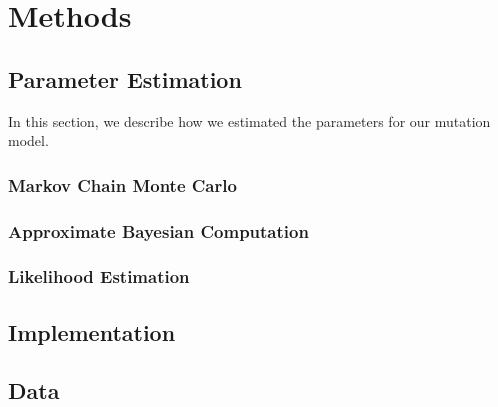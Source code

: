 \section{Methods}\label{sec:m}
\subsection{Parameter Estimation}\label{subsec:pe}
In this section, we describe how we estimated the parameters for our mutation model.

\subsubsection{Markov Chain Monte Carlo}
\subsubsection{Approximate Bayesian Computation}
\subsubsection{Likelihood Estimation}

\subsection{Implementation}\label{subsec:i}

\subsection{Data}\label{subsec:d}
